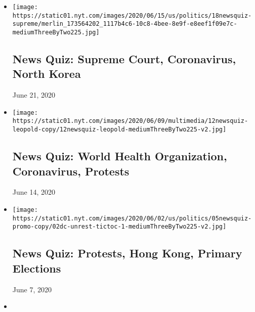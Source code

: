 \begin{itemize}
\item
  \href{https://www.nytimes.com/interactive/2020/06/19/briefing/supreme-court-coronavirus-north-korea-news-quiz.html}{}

  \texttt{[image: https://static01.nyt.com/images/2020/06/15/us/politics/18newsquiz-supreme/merlin\_173564202\_1117b4c6-10c8-4bee-8e9f-e8eef1f09e7c-mediumThreeByTwo225.jpg]}

  \hypertarget{news-quiz-supreme-court-coronavirus-north-korea}{%
  \subsection{News Quiz: Supreme Court, Coronavirus, North
  Korea}\label{news-quiz-supreme-court-coronavirus-north-korea}}

  June 21, 2020
\item
  \href{https://www.nytimes.com/interactive/2020/06/12/briefing/world-health-organization-coronavirus-protests-news-quiz.html}{}

  \texttt{[image: https://static01.nyt.com/images/2020/06/09/multimedia/12newsquiz-leopold-copy/12newsquiz-leopold-mediumThreeByTwo225-v2.jpg]}

  \hypertarget{news-quiz-world-health-organization-coronavirus-protests}{%
  \subsection{News Quiz: World Health Organization, Coronavirus,
  Protests}\label{news-quiz-world-health-organization-coronavirus-protests}}

  June 14, 2020
\item
  \href{https://www.nytimes.com/interactive/2020/06/05/briefing/protests-hong-kong-primary-elections-news-quiz.html}{}

  \texttt{[image: https://static01.nyt.com/images/2020/06/02/us/politics/05newsquiz-promo-copy/02dc-unrest-tictoc-1-mediumThreeByTwo225-v2.jpg]}

  \hypertarget{news-quiz-protests-hong-kong-primary-elections}{%
  \subsection{News Quiz: Protests, Hong Kong, Primary
  Elections}\label{news-quiz-protests-hong-kong-primary-elections}}

  June 7, 2020
\item
  \href{https://www.nytimes.com/interactive/2020/05/29/briefing/george-floyd-twitter-coronavirus-news-quiz.html}{}


\end{itemize}

